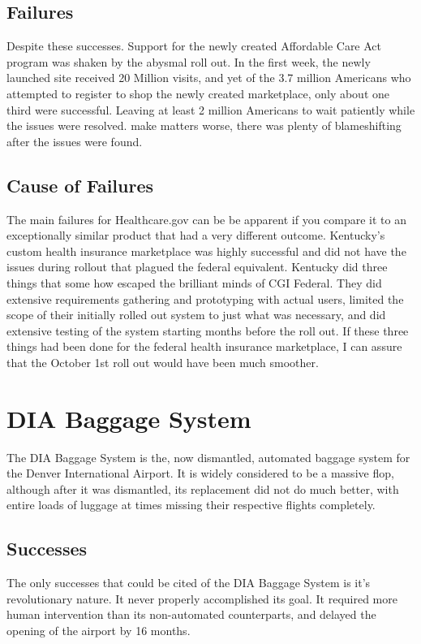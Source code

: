 \documentclass[conference]{IEEEtran}
\begin{document}
	\subsection{Failures}
	Despite these successes. Support for the newly created Affordable Care Act program was shaken by the abysmal roll out. In the first week, the newly launched site received 20 Million visits, and yet of the 3.7 million Americans who attempted to register to shop the newly created marketplace, only about one third were successful. Leaving at least 2 million Americans to wait patiently while the issues were resolved. \cite{hc_informationweek}  make matters worse, there was plenty of blameshifting after the issues were found. 
	\subsection{Cause of Failures}
	The main failures for Healthcare.gov can be be apparent if you compare it to an exceptionally similar product that had a very different outcome. Kentucky's custom health insurance marketplace was highly successful and did not have the issues during rollout that plagued the federal equivalent. Kentucky did three things that some how escaped the brilliant minds of CGI Federal. They did extensive requirements gathering and prototyping with actual users, limited the scope of their initially rolled out system to just what was necessary, and did extensive testing of the system starting months before the roll out. If these three things had been done for the federal health insurance marketplace, I can assure that the October 1st roll out would have been much smoother. \cite{hc_tpm}
\section{DIA Baggage System}
	The DIA Baggage System is the, now dismantled, automated baggage system for the Denver International Airport. It is widely considered to be a massive flop, although after it was dismantled, its replacement did not do much better, with entire loads of luggage at times missing their respective flights completely. \cite{dia_denverpost} 
	\subsection{Successes}
		The only successes that could be cited of the DIA Baggage System is it's revolutionary nature. It never properly accomplished its goal. It required more human intervention than its non-automated counterparts, and delayed the opening of the airport by 16 months.
\end{document}
